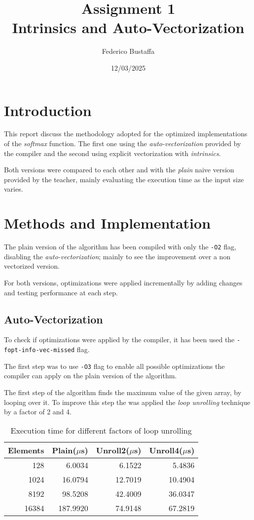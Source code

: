 \documentclass[12pt, a4paper]{article}
\title{Assignment 1\\Intrinsics and Auto-Vectorization}
\author{Federico Bustaffa}
\date{12/03/2025}
\begin{document}
\maketitle
\tableofcontents

\section{Introduction}

This report discuss the methodology adopted for the optimized implementations
of the \textit{softmax} function. The first one using the \textit{auto-vectorization}
provided by the compiler and the second using explicit vectorization with
\textit{intrinsics}.

Both versions were compared to each other and with the \textit{plain} naive
version provided by the teacher, mainly evaluating the execution time as the
input size varies.

\section{Methods and Implementation}

The plain version of the algorithm has been compiled with only the \verb|-O2|
flag, disabling the \textit{auto-vectorization}; mainly to see the improvement
over a non vectorized version.

For both versions, optimizations were applied incrementally by adding changes
and testing performance at each step.

\subsection{Auto-Vectorization}

To check if optimizations were applied by the compiler, it has been used the
\verb|-fopt-info-vec-missed| flag.

The first step was to use \verb|-O3| flag to enable all possible optimizations
the compiler can apply on the plain version of the algorithm.

The first step of the algorithm finds the maximum value of the given array, by
looping over it. To improve this step the was applied the \textit{loop unrolling}
technique by a factor of 2 and 4.

\begin{table}[H]
	\centering
	\begin{tabular}{rrrr}
		\toprule
		Elements & Plain($\mu$s) & Unroll2($\mu$s) & Unroll4($\mu$s) \\
		\midrule
		128      & 6.0034        & 6.1522          & 5.4836          \\
		1024     & 16.0794       & 12.7019         & 10.4904         \\
		8192     & 98.5208       & 42.4009         & 36.0347         \\
		16384    & 187.9920      & 74.9148         & 67.2819         \\
		\bottomrule
	\end{tabular}
	\caption{Execution time for different factors of loop unrolling}
\end{table}
\end{document}
